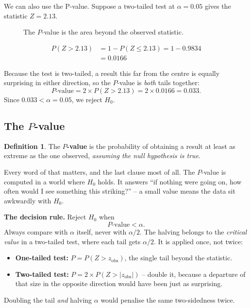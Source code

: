 \documentclass[11pt,a4paper]{article}
\theoremstyle{definition}
\newtheorem{definition}[thm]{Definition}
\begin{document}
We can also use the P-value. Suppose a two-tailed test at $\alpha=0.05$ gives the statistic $Z=2.13$.



\begin{figure}[H]
\centering
{}
\caption{The $P$-value is the area beyond the observed statistic.}
\end{figure}









\begin{align*}
P(Z>2.13) &=1-P(Z\leq 2.13)=1-0.9834\\
&=0.0166
\end{align*}

Because the test is two-tailed, a result this far from the centre is equally surprising in
either direction, so the $P$-value is \emph{both} tails together:
\[P\text{-value} = 2\times P(Z>2.13) = 2\times 0.0166 = 0.033.\]
Since $0.033 < \alpha = 0.05$, we reject $H_0$.

\subsection{The $P$-value}

\begin{definition}
The \textbf{$P$-value} is the probability of obtaining a result at least as extreme as the
one observed, \emph{assuming the null hypothesis is true}.
\end{definition}

Every word of that matters, and the last clause most of all. The $P$-value is computed in a
world where $H_0$ holds. It answers ``if nothing were going on, how often would I see
something this striking?'' -- a small value means the data sit awkwardly with $H_0$.

\textbf{The decision rule.} Reject $H_0$ when
\[P\text{-value} < \alpha.\]
Always compare with $\alpha$ itself, never with $\alpha/2$. The halving belongs to the
\emph{critical value} in a two-tailed test, where each tail gets $\alpha/2$. It is applied
once, not twice:
\begin{itemize}
\item \textbf{One-tailed test:} $P = P(Z > z_{\text{obs}})$, the single tail beyond the
statistic.
\item \textbf{Two-tailed test:} $P = 2\times P(Z > |z_{\text{obs}}|)$ -- double it, because
a departure of that size in the opposite direction would have been just as surprising.
\end{itemize}
Doubling the tail \emph{and} halving $\alpha$ would penalise the same two-sidedness twice.
\end{document}
